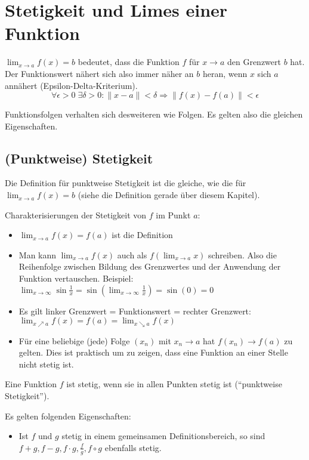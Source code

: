 \section{Stetigkeit und Limes einer Funktion}
$\lim_{x \to a} f(x) = b$ bedeutet, dass die Funktion $f$ für $x \to a$ den
Grenzwert $b$ hat. Der Funktionswert nähert sich also immer näher an $b$ heran,
wenn $x$ sich $a$ annähert (Epsilon-Delta-Kriterium).
\[
\forall \epsilon > 0 \; \exists \delta > 0: \|x -a\| < \delta \Rightarrow
\|f(x) - f(a)\| < \epsilon
\]

Funktionsfolgen verhalten sich desweiteren wie Folgen. Es gelten also die
gleichen Eigenschaften.

\subsection{(Punktweise) Stetigkeit}
Die Definition für punktweise Stetigkeit ist die gleiche, wie die für
$\lim_{x \to a} f(x) = b$ (siehe die Definition gerade über diesem Kapitel).

Charakterisierungen der Stetigkeit von $f$ im Punkt $a$:
\begin{itemize}
	\item $\lim_{x \to a} f(x) = f(a)$ ist die Definition
	\item Man kann $\lim_{x \to a} f(x)$ auch als $f(\lim_{x \to a} x)$ schreiben.
	Also die Reihenfolge zwischen Bildung des Grenzwertes und der Anwendung der
	Funktion vertauschen. Beispiel: $\lim_{x \to \infty} \sin\frac{1}{x} =
	\sin(\lim_{x \to \infty} \frac{1}{x}) = \sin(0) = 0$
	\item Es gilt linker Grenzwert = Funktionswert = rechter Grenzwert: $\lim_{x
	\nearrow a} f(x) = f(a) = \lim_{x \searrow a} f(x)$
	\item Für eine beliebige (jede) Folge $(x_n)$ mit $x_n \to a$ hat $f(x_n) \to
	f(a)$ zu gelten. Dies ist praktisch um zu zeigen, dass eine Funktion an einer
	Stelle nicht stetig ist.
\end{itemize}

Eine Funktion $f$ ist stetig, wenn sie in allen Punkten stetig ist
(``punktweise Stetigkeit'').

Es gelten folgenden Eigenschaften:
\begin{itemize}
	\item Ist $f$ und $g$ stetig in einem gemeinsamen Definitionsbereich, so sind
	$f + g, f- g, f \cdot g, \frac{f}{g}, f \circ g$ ebenfalls stetig.
\end{itemize}

